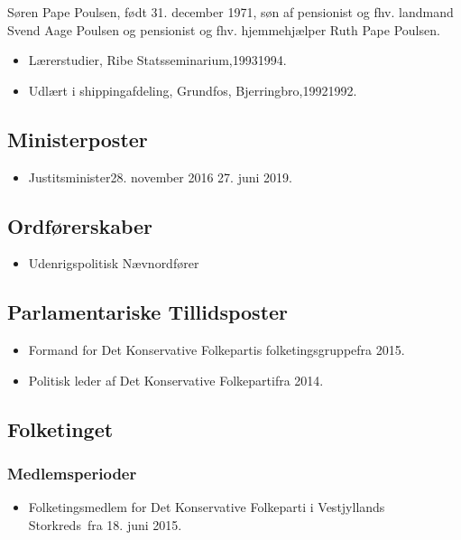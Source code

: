 \documentclass[11pt, a4paper]{awesome-cv}
\begin{document}
\makecvheader[R]
\makelettertitle
\begin{cvletter}
Søren Pape Poulsen, født 31. december 1971, søn af pensionist og fhv. landmand Svend Aage Poulsen og pensionist og fhv. hjemmehjælper Ruth Pape Poulsen.

\begin{itemize}
\item Lærerstudier, Ribe Statsseminarium,19931994.
\item Udlært i shippingafdeling, Grundfos, Bjerringbro,19921992.
\end{itemize}
\subsection*{Ministerposter}
\begin{itemize}
\item Justitsminister28. november 2016  27. juni 2019.
\end{itemize}
\subsection*{Ordførerskaber}
\begin{itemize}
\item Udenrigspolitisk Nævnordfører
\end{itemize}
\subsection*{Parlamentariske Tillidsposter}
\begin{itemize}
\item Formand for Det Konservative Folkepartis folketingsgruppefra 2015.
\item Politisk leder af Det Konservative Folkepartifra 2014.
\end{itemize}
\subsection*{Folketinget}
\subsubsection*{Medlemsperioder}
\begin{itemize}
\item Folketingsmedlem for Det Konservative Folkeparti i Vestjyllands Storkreds fra 18. juni 2015.
\end{itemize}

\end{cvletter}
\end{document}
